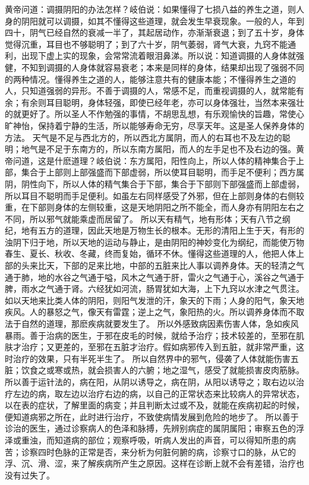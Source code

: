 \documentclass[a4paper,12pt,UTF8,twoside]{ctexbook}
\begin{document}
黄帝问道：调摄阴阳的办法怎样？岐伯说：如果懂得了七损八益的养生之道，则人身的阴阳就可以调摄，如其不懂得这些道理，就会发生早衰现象。一般的人，年到四十，阴气已经自然的衰减一半了，其起居动作，亦渐渐衰退；到了五十岁，身体觉得沉重，耳目也不够聪明了；到了六十岁，阴气萎弱，肾气大衰，九窍不能通利，出现下虚上实的现象，会常常流着眼泪鼻涕。所以说：知道调摄的人身体就强健，不知到调摄的人身体就容易衰老；本来是同样的身体，结果却出现了强弱不同的两种情况。懂得养生之道的人，能够注意共有的健康本能；不懂得养生之道的人，只知道强弱的异形。不善于调摄的人，常感不足，而重视调摄的人，就常能有余；有余则耳目聪明，身体轻强，即使已经年老，亦可以身体强壮，当然本来强壮的就更好了。所以圣人不作勉强的事情，不胡思乱想，有乐观愉快的旨趣，常使心旷神怡，保持着宁静的生活，所以能够寿命无穷，尽享天年。这是圣人保养身体的方法。
天气是不足与西北方的，所以西北方属阴，而人的右耳也不及左边的聪明；地气是不足于东南方的，所以东南方属阳，而人的左手足也不及右边的强。黄帝问道，这是什麽道理？岐伯说：东方属阳，阳性向上，所以人体的精神集合于上部，集合于上部则上部强盛而下部虚弱，所以使耳目聪明，而手足不便利；西方属阴，阴性向下，所以人体的精气集合于下部，集合于下部则下部强盛而上部虚弱，所以耳目不聪明而手足便利。如虽左右同样感受了外邪，但在上部则身体的右侧较重，在下部则身体的左侧较重，这是天地阴阳之所不能全，而人身亦有阴阳左右之不同，所以邪气就能乘虚而居留了。
所以天有精气，地有形体；天有八节之纲纪，地有五方的道理，因此天地是万物生长的根本。无形的清阳上生于天，有形的浊阴下归于地，所以天地的运动与静止，是由阴阳的神妙变化为纲纪，而能使万物春生、夏长、秋收、冬藏，终而复始，循环不休。懂得这些道理的人，他把人体上部的头来比天，下部的足来比地，中部的五脏来比人事以调养身体。天的轻清之气通于肺，地的水谷之气通于嗌，风木之气通于肝，雷火之气通于心，溪谷之气通于脾，雨水之气通于肾。六经犹如河流，肠胃犹如大海，上下九窍以水津之气贯注。如以天地来比类人体的阴阳，则阳气发泄的汗，象天的下雨；人身的阳气，象天地疾风。人的暴怒之气，像天有雷霆；逆上之气，象阳热的火。所以调养身体而不取法于自然的道理，那麽疾病就要发生了。
所以外感致病因素伤害人体，急如疾风暴雨。善于治病的医生，于邪在皮毛的时候，就给予治疗；技术较差的，至邪在肌肤才治疗；又更差的，至邪在五脏才治疗。假如病邪传入到五脏，就非常严重，这时治疗的效果，只有半死半生了。
所以自然界中的邪气，侵袭了人体就能伤害五脏；饮食之或寒或热，就会损害人的六腑；地之湿气，感受了就能损害皮肉筋脉。
所以善于运针法的，病在阳，从阴以诱导之，病在阴，从阳以诱导之；取右边以治疗左边的病，取左边以治疗右边的病，以自己的正常状态来比较病人的异常状态，以在表的症状，了解里面的病变；并且判断太过或不及，就能在疾病初起的时候，便知道病邪之所在，此时进行治疗，不致使病情发展到危险的地步了。
所以善于诊治的医生，通过诊察病人的色泽和脉搏，先辨别病症的属阴属阳；审察五色的浮泽或重浊，而知道病的部位；观察呼吸，听病人发出的声音，可以得知所患的病苦；诊察四时色脉的正常是否，来分析为何脏何腑的病，诊察寸口的脉，从它的浮、沉、滑、涩，来了解疾病所产生之原因。这样在诊断上就不会有差错，治疗也没有过失了。
\end{document}
